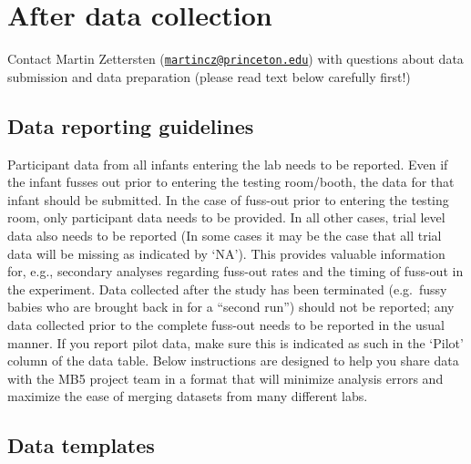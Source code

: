 \documentclass[
]{book}
\begin{document}
\hypertarget{after-data-collection}{%
\chapter{After data collection}\label{after-data-collection}}

Contact Martin Zettersten (\href{mailto:martincz@princeton.edu}{\nolinkurl{martincz@princeton.edu}}) with questions about data submission and data preparation (please read text below carefully first!)

\hypertarget{data-reporting-guidelines}{%
\section{Data reporting guidelines}\label{data-reporting-guidelines}}

Participant data from all infants entering the lab needs to be reported. Even if the infant fusses out prior to entering the testing room/booth, the data for that infant should be submitted. In the case of fuss-out prior to entering the testing room, only participant data needs to be provided. In all other cases, trial level data also needs to be reported (In some cases it may be the case that all trial data will be missing as indicated by `NA'). This provides valuable information for, e.g., secondary analyses regarding fuss-out rates and the timing of fuss-out in the experiment. Data collected after the study has been terminated (e.g.~fussy babies who are brought back in for a ``second run'') should not be reported; any data collected prior to the complete fuss-out needs to be reported in the usual manner. If you report pilot data, make sure this is indicated as such in the `Pilot' column of the data table.
Below instructions are designed to help you share data with the MB5 project team in a format that will minimize analysis errors and maximize the ease of merging datasets from many different labs.

\hypertarget{data-templates}{%
\section{Data templates}\label{data-templates}}
\end{document}
